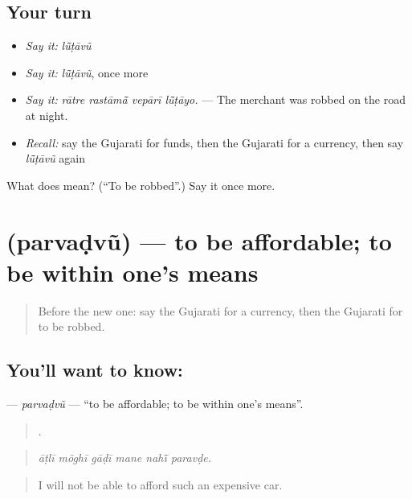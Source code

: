 \subsection*{Your turn}
\begin{itemize}
\raggedright
  \item \emph{Say it:} \emph{lū̃ṭāvũ}
  \item \emph{Say it:} \emph{lū̃ṭāvũ}, once more
  \item \emph{Say it:} \emph{rātre rastāmā̃ vepārī lū̃ṭāyo.} — The merchant was robbed on the road at night.
  \item \emph{Recall:} say the Gujarati for funds, then the Gujarati for a currency, then say \emph{lū̃ṭāvũ} again
\end{itemize}

\begin{tcolorbox}[breakable,colback=teal!4,colframe=teal!35!black,title={Before you move on}]
What does  mean? (\textquotedblleft{}To be robbed\textquotedblright{}.) Say it once more.
\end{tcolorbox}
\section[\texorpdfstring{\gu{પરવડવું} (parvaḍvũ)}{પરવડવું (parvaḍvũ)}]{ (parvaḍvũ) — to be affordable; to be within one's means}

\label{lesson:GU-C429-parvadvu}



\begin{quote}
Before the new one: say the Gujarati for a currency, then the Gujarati for to be robbed.
\end{quote}

\subsection*{You'll want to know: }
\textbf{} — \emph{parvaḍvũ} — \textquotedblleft{}to be affordable; to be within one's means\textquotedblright{}.

\begin{quote}
     .
\end{quote}

\begin{quote}
\emph{āṭlī mõghī gāḍī mane nahī̃ paravḍe.}
\end{quote}

\begin{quote}
I will not be able to afford such an expensive car.
\end{quote}

